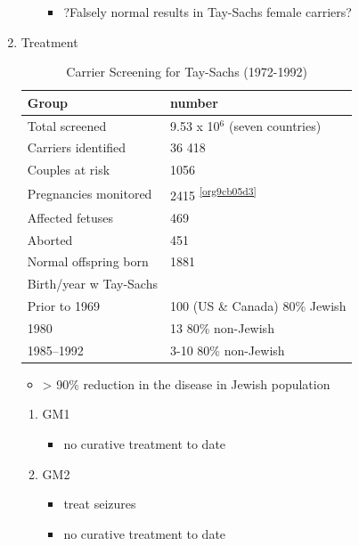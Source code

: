 \documentclass{scrartcl}
\begin{document}
\begin{enumerate}
\begin{enumerate}
\begin{itemize}
\item ?Falsely normal results in Tay-Sachs female carriers?
\end{itemize}
\end{enumerate}

\item Treatment
\label{sec:org526dc08}
\begin{table}[htbp]
\caption{\label{tab:orgeaa180e}
Carrier Screening for Tay-Sachs (1972-1992)}
\centering
\begin{tabular}{ll}
Group & number\\
\hline
Total screened & 9.53 x 10\(^{\text{6}}\) (seven countries)\\
Carriers identified & 36 418\\
Couples at risk & 1056\\
Pregnancies monitored & 2415 \textsuperscript{\ref{org9cb05d3}}\\
Affected fetuses & 469\\
Aborted & 451\\
Normal offspring born & 1881\\
Birth/year w Tay-Sachs & \\
Prior to 1969 & 100 (US \& Canada) 80\% Jewish\\
1980 & 13 80\% non-Jewish\\
1985–1992 & 3-10 80\% non-Jewish\\
\end{tabular}
\end{table}

\begin{itemize}
\item > 90\% reduction in the disease in Jewish population
\end{itemize}

\begin{enumerate}
\item GM1
\label{sec:org5ed58f5}
\begin{itemize}
\item no curative treatment to date
\end{itemize}
\item GM2
\label{sec:org4585fea}
\begin{itemize}
\item treat seizures
\item no curative treatment to date
\end{itemize}
\end{enumerate}
\end{enumerate}
\end{document}
